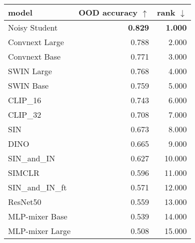 \begin{tabular}{lrr}
\toprule
           model & OOD accuracy $\uparrow$ & rank $\downarrow$ \\
\midrule
   Noisy Student &          \textbf{0.829} &    \textbf{1.000} \\
  Convnext Large &                   0.788 &             2.000 \\
   Convnext Base &                   0.771 &             3.000 \\
      SWIN Large &                   0.768 &             4.000 \\
       SWIN Base &                   0.759 &             5.000 \\
        CLIP\_16 &                   0.743 &             6.000 \\
        CLIP\_32 &                   0.708 &             7.000 \\
             SIN &                   0.673 &             8.000 \\
            DINO &                   0.665 &             9.000 \\
    SIN\_and\_IN &                   0.627 &            10.000 \\
          SIMCLR &                   0.596 &            11.000 \\
SIN\_and\_IN\_ft &                   0.571 &            12.000 \\
        ResNet50 &                   0.559 &            13.000 \\
  MLP-mixer Base &                   0.539 &            14.000 \\
 MLP-mixer Large &                   0.508 &            15.000 \\
\bottomrule
\end{tabular}

